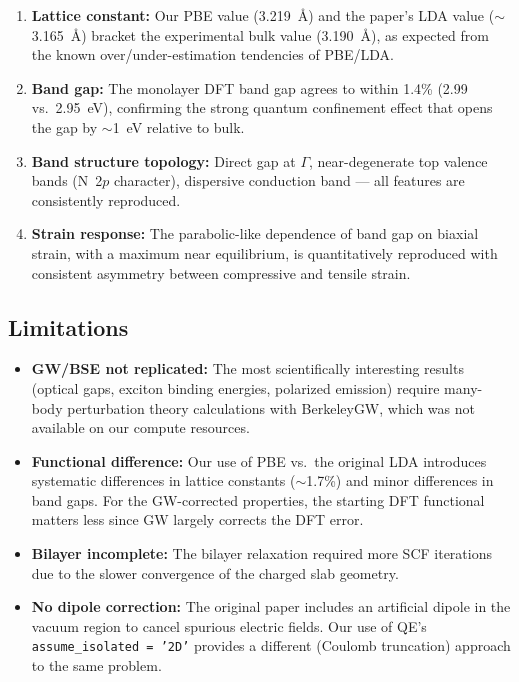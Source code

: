 \documentclass[11pt]{article}
\begin{document}
\begin{enumerate}
    \item \textbf{Lattice constant:} Our PBE value (3.219~\AA) and the paper's LDA value ($\sim$3.165~\AA) bracket the experimental bulk value (3.190~\AA), as expected from the known over/under-estimation tendencies of PBE/LDA.
    
    \item \textbf{Band gap:} The monolayer DFT band gap agrees to within 1.4\% (2.99 vs.\ 2.95~eV), confirming the strong quantum confinement effect that opens the gap by $\sim$1~eV relative to bulk.
    
    \item \textbf{Band structure topology:} Direct gap at $\Gamma$, near-degenerate top valence bands (N~2$p$ character), dispersive conduction band --- all features are consistently reproduced.
    
    \item \textbf{Strain response:} The parabolic-like dependence of band gap on biaxial strain, with a maximum near equilibrium, is quantitatively reproduced with consistent asymmetry between compressive and tensile strain.
\end{enumerate}

\subsection{Limitations}

\begin{itemize}
    \item \textbf{GW/BSE not replicated:} The most scientifically interesting results (optical gaps, exciton binding energies, polarized emission) require many-body perturbation theory calculations with BerkeleyGW, which was not available on our compute resources.
    
    \item \textbf{Functional difference:} Our use of PBE vs.\ the original LDA introduces systematic differences in lattice constants ($\sim$1.7\%) and minor differences in band gaps. For the GW-corrected properties, the starting DFT functional matters less since GW largely corrects the DFT error.
    
    \item \textbf{Bilayer incomplete:} The bilayer relaxation required more SCF iterations due to the slower convergence of the charged slab geometry.
    
    \item \textbf{No dipole correction:} The original paper includes an artificial dipole in the vacuum region to cancel spurious electric fields. Our use of QE's \texttt{assume\_isolated = '2D'} provides a different (Coulomb truncation) approach to the same problem.
\end{itemize}
\end{document}
